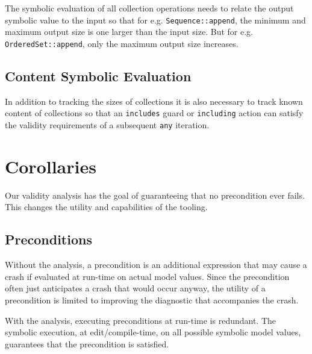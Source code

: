 \documentclass[
]{ceurart}
\begin{document}
The symbolic evaluation of all collection operations needs to relate the output symbolic value to the input so that for e.g. \verb|Sequence::append|, the minimum and maximum output size is one larger than the input size. But for e.g.
\verb|OrderedSet::append|, only the maximum output size increases.


\subsection{Content Symbolic Evaluation}

In addition to tracking the sizes of collections it is also necessary to track known content of collections so that an \verb|includes| guard or \verb|including| action can satisfy the validity requirements of a subsequent \verb|any| iteration.


\section{Corollaries}\label{Corollaries}

Our validity analysis has the goal of guaranteeing that no precondition ever fails. This changes the utility and capabilities of the tooling.

\subsection{Preconditions}

Without the analysis, a precondition is an additional expression that may cause a crash if evaluated at run-time on actual model values. Since the precondition often just anticipates a crash that would occur anyway, the utility of a precondition is limited to improving the diagnostic that accompanies the crash.

With the analysis, executing preconditions at run-time is redundant. The symbolic execution, at edit/compile-time, on all possible symbolic model values, guarantees that the precondition is satisfied.
\end{document}
